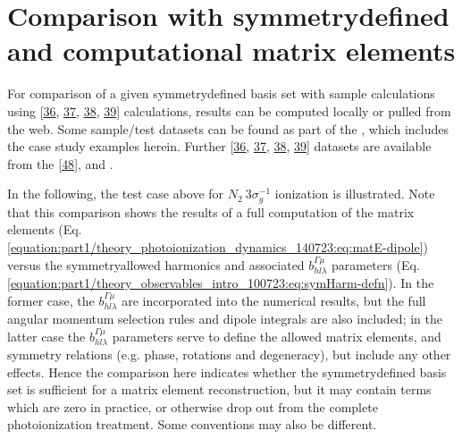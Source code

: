 \documentclass[letterpaper,table,10pt,english]{jupyterBook}
\begin{document}
\section{Comparison with symmetry\sphinxhyphen{}defined and computational matrix elements}
\label{\detokenize{part2/sym-fitting-intro_240723:comparison-with-symmetry-defined-and-computational-matrix-elements}}\label{\detokenize{part2/sym-fitting-intro_240723:sec-basis-sets-comparison-with-abinitio}}
\sphinxAtStartPar
For comparison of a given symmetry\sphinxhyphen{}defined basis set with sample  calculations using  {[}\hyperlink{cite.backmatter/bibliography:id762}{36}, \hyperlink{cite.backmatter/bibliography:id626}{37}, \hyperlink{cite.backmatter/bibliography:id803}{38}, \hyperlink{cite.backmatter/bibliography:id765}{39}{]} calculations, results can be computed locally or pulled from the web. Some sample/test datasets can be found as part of the , which includes the case study examples herein. Further  {[}\hyperlink{cite.backmatter/bibliography:id762}{36}, \hyperlink{cite.backmatter/bibliography:id626}{37}, \hyperlink{cite.backmatter/bibliography:id803}{38}, \hyperlink{cite.backmatter/bibliography:id765}{39}{]} datasets are available from the  {[}\hyperlink{cite.backmatter/bibliography:id677}{48}{]}, and .

\sphinxAtStartPar
In the following, the test case above for \(N_2~3\sigma_g^{-1}\) ionization is illustrated. Note that this comparison shows the results of a full  computation of the matrix elements (Eq. \eqref{equation:part1/theory_photoionization_dynamics_140723:eq:matE-dipole}) versus the symmetry\sphinxhyphen{}allowed harmonics and associated \(b_{hl\lambda}^{\Gamma\mu}\) parameters (Eq. \eqref{equation:part1/theory_observables_intro_100723:eq:symHarm-defn}). In the former case, the \(b_{hl\lambda}^{\Gamma\mu}\) are incorporated into the numerical results, but the full angular momentum selection rules and dipole integrals are also included; in the latter case the \(b_{hl\lambda}^{\Gamma\mu}\) parameters serve to define the allowed matrix elements, and symmetry relations (e.g. phase, rotations and degeneracy), but  include any other effects. Hence the comparison here indicates whether the symmetry\sphinxhyphen{}defined basis set is sufficient for a matrix element reconstruction, but it may contain terms which are zero in practice, or otherwise drop out from the complete photoionization treatment. Some conventions may also be different.
\end{document}
